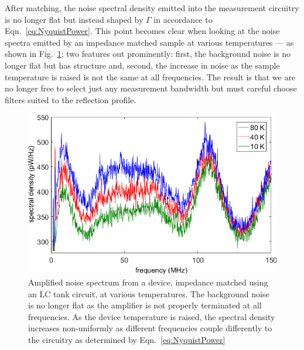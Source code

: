 After matching, the noise spectral density emitted into the measurement circuitry is no longer flat but instead shaped by $\Gamma$ in accordance to Eqn.~\ref{eq:NyquistPower}. This point becomes clear when looking at the noise spectra emitted by an impedance matched sample at various temperatures --- as shown in Fig.~\ref{fig:spectrum_matching}; two features out prominently: first, the background noise is no longer flat but has structure and, second, the increase in noise as the sample temperature is raised is not the same at all frequencies. The result is that we are no longer free to select just any measurement bandwidth but must careful choose filters suited to the reflection profile.
\begin{figure}
\centering
\includegraphics[width = 120mm]{figures/Johnson_noise_thermometry/Matched_spectra.png}
\caption{Amplified noise spectrum from a device, impedance matched using an LC tank circuit, at various temperatures. The background noise is no longer flat as the amplifier is not properly terminated at all frequencies. As the device temperature is raised, the spectral density increases non-uniformly as different frequencies couple differently to the circuitry as determined by Eqn.~\ref{eq:NyquistPower}}
\label{fig:spectrum_matching}
\end{figure}

